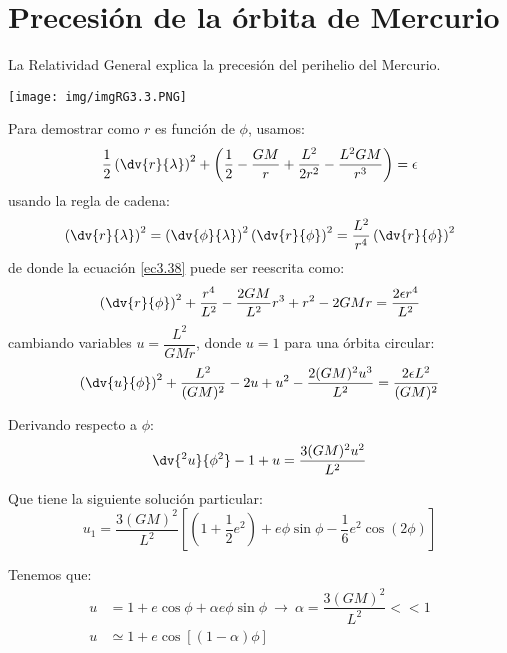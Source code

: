 \documentclass[../main]{subfiles}
\begin{document}
\section{Precesión de la órbita de Mercurio}

La Relatividad General explica la precesión del perihelio del Mercurio.
\begin{center}
    \texttt{[image: img/imgRG3.3.PNG]}
\end{center}

Para demostrar como $r$ es función de $\phi$, usamos:
\begin{equation}
    \dfrac{1}{2}\left(\dv{r}{\lambda}\right)^2+\left(\dfrac{1}{2}-\dfrac{GM}{r}+\dfrac{L^2}{2r^2}-\dfrac{L^2 GM}{r^3}\right)=\epsilon
    \label{ec3.38}
\end{equation}
usando la regla de cadena:
\begin{equation}
    \left(\dv{r}{\lambda}\right)^2=\left(\dv{\phi}{\lambda}\right)^2\left(\dv{r}{\phi}\right)^2=\dfrac{L^2}{r^4}\left(\dv{r}{\phi}\right)^2
\end{equation}
de donde la ecuación \eqref{ec3.38} puede ser reescrita como:
\begin{equation}
    \left(\dv{r}{\phi}\right)^2+\dfrac{r^4}{L^2}-\dfrac{2GM}{L^2}r^3+r^2-2GMr=\dfrac{2\epsilon r^4}{L^2}
\end{equation}
cambiando variables $u=\dfrac{L^2}{GMr}$, donde $u=1$ para una órbita circular:
\begin{equation}
    \left(\dv{u}{\phi}\right)^2+\dfrac{L^2}{(GM)^2}-2u+u^2-\dfrac{2(GM)^2 u^3}{L^2}=\dfrac{2\epsilon L^2}{(GM)^2}
\end{equation}

Derivando respecto a $\phi$:
\begin{equation}
    \dv{^2 u}{\phi^2}-1+u=\dfrac{3(GM)^2 u^2}{L^2}
\end{equation}

Que tiene la siguiente solución particular:
\begin{equation}
    u_1=\dfrac{3(GM)^2}{L^2}\left[\left(1+\dfrac{1}{2}e^2\right)+e\phi\sin \phi-\dfrac{1}{6}e^2\cos(2\phi)\right]
\end{equation}

Tenemos que:
\begin{equation}
    \begin{split}
        u&=1+e\cos \phi+\alpha e\phi \sin\phi \ \rightarrow \ \alpha=\dfrac{3(GM)^2}{L^2}<<1\\
        u&\simeq 1+e\cos\left[(1-\alpha)\phi\right]
    \end{split}
\end{equation}
\end{document}
